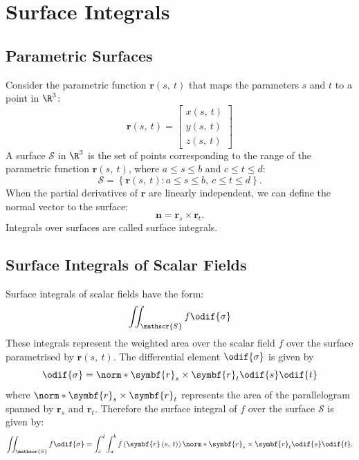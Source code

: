\documentclass{article}
\begin{document}
\section{Surface Integrals}
\subsection{Parametric Surfaces}
Consider the parametric function \(\symbf{r}\left( s,\: t \right)\)
that maps the parameters \(s\) and \(t\) to a point in \(\R^3\):
\begin{equation*}
    \symbf{r}\left( s,\: t \right) =
    \begin{bmatrix}
        x\left( s,\: t \right) \\
        y\left( s,\: t \right) \\
        z\left( s,\: t \right)
    \end{bmatrix}
\end{equation*}
A surface \(\mathscr{S}\) in \(\R^3\) is the set of points corresponding
to the range of the parametric function \(\symbf{r}\left( s,\: t \right)\),
where \(a \leqslant s \leqslant b\) and \(c \leqslant t \leqslant d\):
\begin{equation*}
    \mathscr{S} = \left\{ \symbf{r}\left( s,\: t \right) : a \leqslant s \leqslant b, \: c \leqslant t \leqslant d \right\}.
\end{equation*}
When the partial derivatives of \(\symbf{r}\) are linearly independent,
we can define the normal vector to the surface:
\begin{equation*}
    \symbf{n} = \symbf{r}_s \times \symbf{r}_t.
\end{equation*}
Integrals over surfaces are called surface integrals.
\subsection{Surface Integrals of Scalar Fields}
Surface integrals of scalar fields have the form:
\begin{equation*}
    \iint_{\mathscr{S}} f \odif{\sigma}
\end{equation*}
These integrals represent the weighted area over the scalar field \(f\)
over the surface parametrised by \(\symbf{r}\left( s,\: t \right)\).
The differential element \(\odif{\sigma}\) is given by
\begin{equation*}
    \odif{\sigma} = \norm*{\symbf{r}_s \times \symbf{r}_t} \odif{s} \odif{t}
\end{equation*}
where \(\norm*{\symbf{r}_s \times \symbf{r}_t}\) represents the area of
the parallelogram spanned by \(\symbf{r}_s\) and \(\symbf{r}_t\).
Therefore the surface integral of \(f\) over the surface \(\mathscr{S}\)
is given by:
\begin{equation*}
    \iint_{\mathscr{S}} f \odif{\sigma} = \int_c^d \int_a^b f\left( \symbf{r}\left( s,\: t \right) \right) \norm*{\symbf{r}_s \times \symbf{r}_t} \odif{s} \odif{t}.
\end{equation*}
\end{document}

